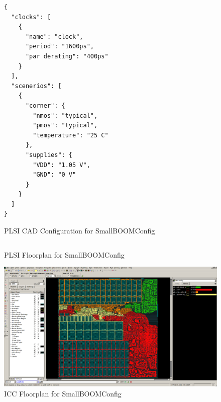 \documentclass{article}
\begin{document}
\begin{figure}
  \begin{verbatim}
{
  "clocks": [
    {
      "name": "clock",
      "period": "1600ps",
      "par derating": "400ps"
    }
  ],
  "scenerios": [
    {
      "corner": {
        "nmos": "typical",
        "pmos": "typical",
        "temperature": "25 C"
      },
      "supplies": {
        "VDD": "1.05 V",
        "GND": "0 V"
      }
    }
  ]
}
\end{verbatim}
  \caption{PLSI CAD Configuration for SmallBOOMConfig}
  \label{res:boom-config}
\end{figure}

\begin{figure}
\begin{verbatim}
\end{verbatim}
  \caption{PLSI Floorplan for SmallBOOMConfig}
  \label{res:boom-fppy}
\end{figure}

\begin{figure}
  \begin{center}
    \includegraphics[width=0.95\linewidth]{figures/icc-boom.png}
  \end{center}
  \caption{ICC Floorplan for SmallBOOMConfig}
  \label{res:boom-icc}
\end{figure}
\end{document}

